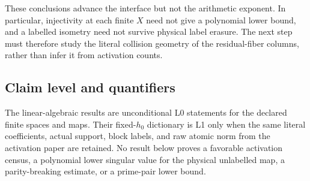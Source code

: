 These conclusions advance the interface but not the arithmetic exponent.  In
particular, injectivity at each finite \(X\) need not give a polynomial lower
bound, and a labelled isometry need not survive physical label erasure.  The
next step must therefore study the literal collision geometry of the
residual-fiber columns, rather than infer it from activation counts.

\subsection*{Claim level and quantifiers}
The linear-algebraic results are unconditional L0 statements for the declared
finite spaces and maps.  Their fixed-\(h_0\) dictionary is L1 only when the same
literal coefficients, actual support, block labels, and raw atomic norm from
the activation paper are retained.  No result below proves a favorable
activation census, a polynomial lower singular value for the physical
unlabelled map, a parity-breaking estimate, or a prime-pair lower bound.
